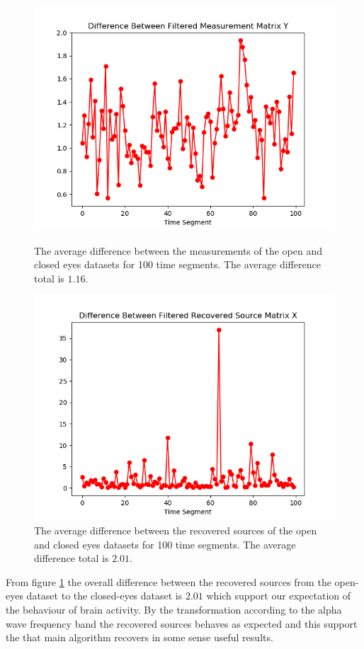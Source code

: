 \begin{figure}[H]
\begin{widepage}
    \begin{minipage}[t]{.49\textwidth}
\centering
\includegraphics[width=1\linewidth]{figures/ch_7/DFT_Y_Difference.png}
\caption{The average difference between the measurements of the open and closed eyes datasets for 100 time segments. The average difference total is $1.16$.}
\label{fig:dft_5}
\end{minipage} 
\hspace{.5cm}
\begin{minipage}[t]{.49\textwidth}
\centering
\includegraphics[width=1\linewidth]{figures/ch_7/DFT_X_Difference.png}
\caption{The average difference between the recovered sources of the open and closed eyes datasets for 100 time segments. The average difference total is $2.01$.}
	\label{fig:dft_6}
    \end{minipage}
\end{widepage}
\end{figure}
\noindent
From figure \ref{fig:dft_6} the overall difference between the recovered sources from the open-eyes dataset to the closed-eyes dataset is $2.01$ which support our expectation of the behaviour of brain activity. By the transformation according to the alpha wave frequency band the recovered sources behaves as expected and this support the that main algorithm recovers in some sense useful results.